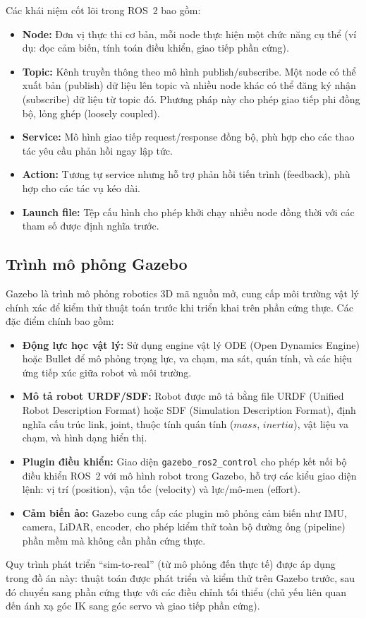 Các khái niệm cốt lõi trong ROS~2 bao gồm:

\begin{itemize}
    \item \textbf{Node:} Đơn vị thực thi cơ bản, mỗi node thực hiện một chức năng cụ thể (ví dụ: đọc cảm biến, tính toán điều khiển, giao tiếp phần cứng).

    \item \textbf{Topic:} Kênh truyền thông theo mô hình publish/subscribe. Một node có thể xuất bản (publish) dữ liệu lên topic và nhiều node khác có thể đăng ký nhận (subscribe) dữ liệu từ topic đó. Phương pháp này cho phép giao tiếp phi đồng bộ, lỏng ghép (loosely coupled).

    \item \textbf{Service:} Mô hình giao tiếp request/response đồng bộ, phù hợp cho các thao tác yêu cầu phản hồi ngay lập tức.

    \item \textbf{Action:} Tương tự service nhưng hỗ trợ phản hồi tiến trình (feedback), phù hợp cho các tác vụ kéo dài.

    \item \textbf{Launch file:} Tệp cấu hình cho phép khởi chạy nhiều node đồng thời với các tham số được định nghĩa trước.
\end{itemize}

\subsection{Trình mô phỏng Gazebo}

Gazebo \cite{gazebo} là trình mô phỏng robotics 3D mã nguồn mở, cung cấp môi trường vật lý chính xác để kiểm thử thuật toán trước khi triển khai trên phần cứng thực. Các đặc điểm chính bao gồm:

\begin{itemize}
    \item \textbf{Động lực học vật lý:} Sử dụng engine vật lý ODE (Open Dynamics Engine) hoặc Bullet để mô phỏng trọng lực, va chạm, ma sát, quán tính, và các hiệu ứng tiếp xúc giữa robot và môi trường.

    \item \textbf{Mô tả robot URDF/SDF:} Robot được mô tả bằng file URDF (Unified Robot Description Format) hoặc SDF (Simulation Description Format), định nghĩa cấu trúc link, joint, thuộc tính quán tính ($mass$, $inertia$), vật liệu va chạm, và hình dạng hiển thị.

    \item \textbf{Plugin điều khiển:} Giao diện \texttt{gazebo\_ros2\_control} cho phép kết nối bộ điều khiển ROS~2 với mô hình robot trong Gazebo, hỗ trợ các kiểu giao diện lệnh: vị trí (position), vận tốc (velocity) và lực/mô-men (effort).

    \item \textbf{Cảm biến ảo:} Gazebo cung cấp các plugin mô phỏng cảm biến như IMU, camera, LiDAR, encoder, cho phép kiểm thử toàn bộ đường ống (pipeline) phần mềm mà không cần phần cứng thực.
\end{itemize}

Quy trình phát triển ``sim-to-real'' (từ mô phỏng đến thực tế) được áp dụng trong đồ án này: thuật toán được phát triển và kiểm thử trên Gazebo trước, sau đó chuyển sang phần cứng thực với các điều chỉnh tối thiểu (chủ yếu liên quan đến ánh xạ góc IK sang góc servo và giao tiếp phần cứng).
